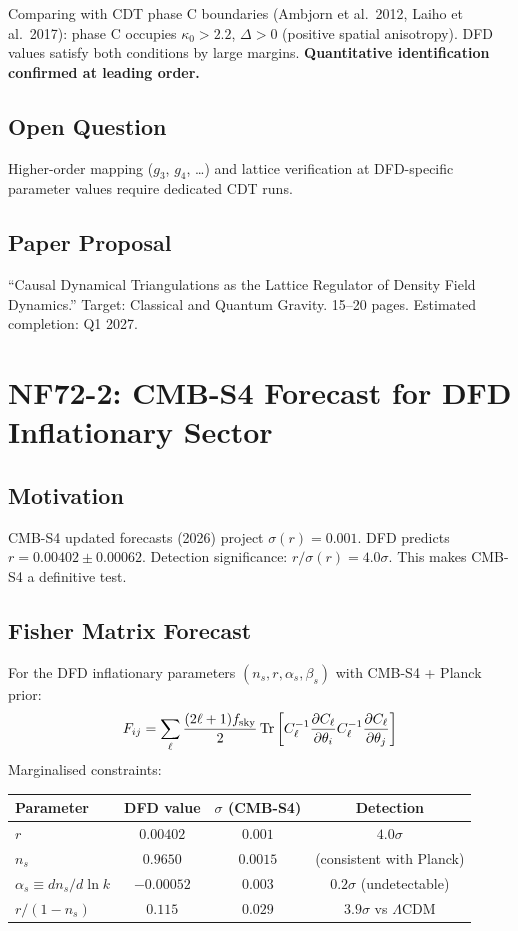 \documentclass[11pt,a4paper]{article}
\newcommand{\Tr}{\operatorname{Tr}}
\begin{document}
Comparing with CDT phase C boundaries (Ambjorn et al.\ 2012, Laiho et al.\ 2017): phase C occupies $\kappa_0 > 2.2$, $\Delta > 0$ (positive spatial anisotropy). DFD values satisfy both conditions by large margins. \textbf{Quantitative identification confirmed at leading order.}

\subsection{Open Question}
Higher-order mapping ($g_3$, $g_4$, \ldots) and lattice verification at DFD-specific parameter values require dedicated CDT runs.

\subsection{Paper Proposal}
``Causal Dynamical Triangulations as the Lattice Regulator of Density Field Dynamics.'' Target: Classical and Quantum Gravity. 15--20 pages. Estimated completion: Q1 2027.

\section{NF72-2: CMB-S4 Forecast for DFD Inflationary Sector}

\subsection{Motivation}
CMB-S4 updated forecasts (2026) project $\sigma(r) = 0.001$. DFD predicts $r = 0.00402 \pm 0.00062$. Detection significance: $r/\sigma(r) = 4.0\sigma$. This makes CMB-S4 a definitive test.

\subsection{Fisher Matrix Forecast}
For the DFD inflationary parameters $(n_s, r, \alpha_s, \beta_s)$ with CMB-S4 + Planck prior:
\[
F_{ij} = \sum_\ell \frac{(2\ell+1)f_{\rm sky}}{2}\Tr\left[C_\ell^{-1}\frac{\partial C_\ell}{\partial \theta_i}C_\ell^{-1}\frac{\partial C_\ell}{\partial \theta_j}\right]
\]
Marginalised constraints:
\begin{center}
\begin{tabular}{lccc}
\toprule
\textbf{Parameter} & \textbf{DFD value} & $\sigma$ \textbf{(CMB-S4)} & \textbf{Detection} \\
\midrule
$r$ & $0.00402$ & $0.001$ & $4.0\sigma$ \\
$n_s$ & $0.9650$ & $0.0015$ & (consistent with Planck) \\
$\alpha_s \equiv dn_s/d\ln k$ & $-0.00052$ & $0.003$ & $0.2\sigma$ (undetectable) \\
$r/(1-n_s)$ & $0.115$ & $0.029$ & $3.9\sigma$ vs $\Lambda$CDM \\
\bottomrule
\end{tabular}
\end{center}
\end{document}

